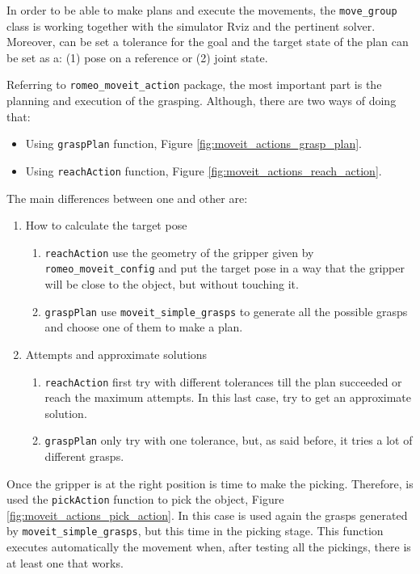 \documentclass[12pt,a4paper,final,twoside,openright]{report}
\begin{document}
In order to be able to make plans and execute the movements, the \texttt{move\_group} class is working together with the simulator Rviz and the pertinent solver. Moreover, can be set a tolerance for the goal and the target state of the plan can be set as a: (1) pose on a reference or (2) joint state.


Referring to \texttt{romeo\_moveit\_action} package, the most important part is the planning and execution of the grasping. Although, there are two ways of doing that: 

\begin{itemize}
\item Using \texttt{graspPlan} function, Figure \ref{fig:moveit_actions_grasp_plan}.
\item Using \texttt{reachAction} function, Figure \ref{fig:moveit_actions_reach_action}.
\end{itemize}

The main differences between one and other are: 
\begin{enumerate}
\item How to calculate the target pose 
\begin{enumerate}
\item \texttt{reachAction} use the geometry of the gripper given by \texttt{romeo\_moveit\_config} and put the target pose in a way that the gripper will be close to the object, but without touching it.
\item \texttt{graspPlan} use \texttt{moveit\_simple\_grasps} to generate all the possible grasps and choose one of them to make a plan.
\end{enumerate}

\item Attempts and approximate solutions
\begin{enumerate}
\item \texttt{reachAction} first try with different tolerances till the plan succeeded or reach the maximum attempts. In this last case, try to get an approximate solution.
\item \texttt{graspPlan} only try with one tolerance, but, as said before, it tries a lot of different grasps.
\end{enumerate}
\end{enumerate}

Once the gripper is at the right position is time to make the picking. Therefore, is used the \texttt{pickAction} function to pick the object, Figure \ref{fig:moveit_actions_pick_action}. In this case is used again the grasps generated by \texttt{moveit\_simple\_grasps}, but this time in the picking stage. This function executes automatically the movement when, after testing all the pickings, there is at least one that works.
\end{document}
